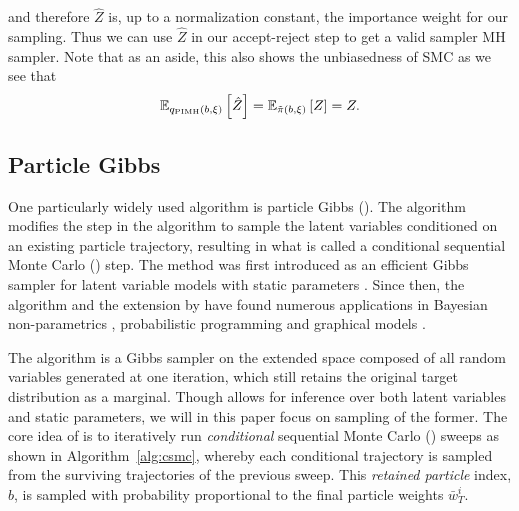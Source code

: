 and therefore $\hat{Z}$ is, up to a normalization constant, the importance weight for our sampling.
Thus we can use $\hat{Z}$ in our accept-reject step to get a valid sampler MH sampler.  Note that
as an aside, this also shows the unbiasedness of SMC as we see that
\begin{align}
\mathbb{E}_{q_{\text{PIMH}}(b,\mathbf{\xi})} \left[\hat{Z}\right]=\mathbb{E}_{\tilde{\pi}(b,\xi)} \left[Z\right]=Z.
\end{align}

\subsection{Particle Gibbs}
\label{sec:part:pmcmc:pgibbs}

One particularly widely used \pmcmc algorithm is particle Gibbs (\pg). The \pg algorithm modifies the \smc step in the \pmcmc algorithm to sample the latent variables conditioned on an existing particle trajectory, resulting in what is called a conditional sequential Monte Carlo (\csmc) step. The \pg method was first introduced as an efficient Gibbs sampler for latent variable models with static parameters \citep{andrieuDH2010}. Since then, the \pg algorithm and the extension by \citet{lindstenJS2014} have found numerous applications in \eg Bayesian non-parametrics \citep{ValeraFSPC2015,tripuraneni2015}, probabilistic programming \citep{wood2014new,vandemeent_aistats_2015} and graphical models \citep{everitt2012,naessethLS2014,naessethLS2015nested}.  

The \pg algorithm \citep{andrieuDH2010} is a Gibbs sampler on the extended space composed of all random variables generated at one iteration, which still retains the original target distribution as a marginal. Though \pg allows for inference over both latent variables and static parameters, we will in this paper focus on sampling of the former.  The core idea of \pg is to iteratively run \emph{conditional} sequential Monte Carlo (\csmc) sweeps as shown in Algorithm~\ref{alg:csmc}, whereby each conditional trajectory is sampled from the surviving trajectories of the previous sweep.  This \emph{retained particle} index, $b$, is sampled with probability proportional to the final particle weights $\bar{w}^i_T$. 

